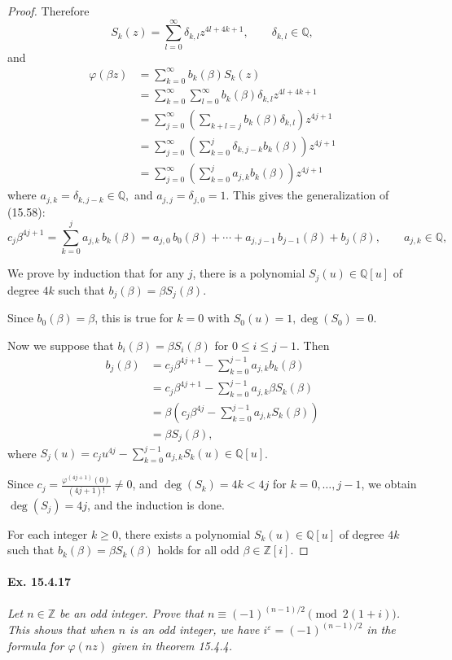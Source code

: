 \documentclass[11pt,a4paper]{article}
\newcommand{\Q}{\mathbb{Q}}
\newcommand{\Z}{\mathbb{Z}}
\begin{document}
\begin{proof}
Therefore
$$S_k(z)  =  \sum_{l=0}^\infty \delta_{k,l} z^{4l+4k+1},\qquad \delta_{k,l} \in \Q,$$
and
\begin{align*}
\varphi(\beta z)  &= \sum_{k=0}^\infty b_k(\beta) S_k(z)\\
&= \sum_{k=0}^\infty \sum_{l=0}^\infty  b_k(\beta)  \delta_{k,l} z^{4l+4k+1}\\
&= \sum_{j=0}^\infty \left( \sum_{k+l = j}  b_k(\beta)  \delta_{k,l}\right) z^{4j+1}\\
&= \sum_{j=0}^\infty \left( \sum_{k=0}^j  \delta_{k,j-k} b_k(\beta)  \right) z^{4j+1}\\
&=\sum_{j=0}^\infty \left( \sum_{k=0}^j  a_{j,k} b_k(\beta)  \right) z^{4j+1}
\end{align*}
where $a_{j,k} = \delta_{k,j-k} \in \Q,$ and $a_{j,j} = \delta_{j,0} = 1$.
This gives the generalization of (15.58):
$$c_j \beta^{4j+1} = \sum_{k=0}^j  a_{j,k}\,  b_k(\beta) = a_{j,0}\, b_0(\beta) + \cdots + a_{j,j-1}\, b_{j-1}(\beta) + b_j(\beta), \qquad a_{j,k} \in \Q,$$


\bigskip

We prove by induction that for any $j$, there is a polynomial $S_j(u) \in \Q[u]$ of degree $4k$ such that $b_j(\beta) = \beta S_j(\beta)$.

Since $b_0(\beta) = \beta$, this is true for $k=0$ with $S_0(u) = 1, \deg(S_0) = 0$.

Now we suppose that $b_i(\beta) = \beta S_{i}(\beta)$ for $0\leq i \leq j-1$. Then
\begin{align*}
b_j(\beta) &= c_j \beta^{4j+1} - \sum_{k=0}^{j-1} a_{j,k} b_k(\beta)\\
&=c_j \beta^{4j+1} - \sum_{k=0}^{j-1} a_{j,k}  \beta S_k(\beta)\\
&= \beta \left(c_j \beta^{4j} - \sum_{k=0}^{j-1} a_{j,k}  S_k(\beta)\right)\\
&=\beta S_j(\beta),
\end{align*}
where $S_j(u) = c_j u^{4j} - \sum_{k=0}^{j-1} a_{j,k}  S_k(u) \in \Q[u]$.

Since $c_j =\frac{ \varphi^{(4j+1)}(0)}{(4j+1)!} \ne 0$, and $\deg(S_k) = 4k < 4j$ for $k=0,\ldots,j-1$, we obtain $\deg(S_j )= 4j$, and the induction is done.

For each integer $k\geq 0$, there exists a polynomial $S_k(u) \in \Q[u]$ of degree $4k$ such that $b_k(\beta) = \beta S_k(\beta)$ holds for all odd $\beta \in \Z[i]$.
\end{proof}

\paragraph{Ex. 15.4.17}{\it  Let $n \in \Z$ be an odd integer. Prove that $n \equiv (-1)^{(n-1)/2} \pmod{2(1+i)}$. This shows that when $n$ is an odd integer, we have $i^\varepsilon = (-1)^{(n-1)/2}$ in the formula for $\varphi(nz)$ given in theorem 15.4.4.
}
\end{document}
